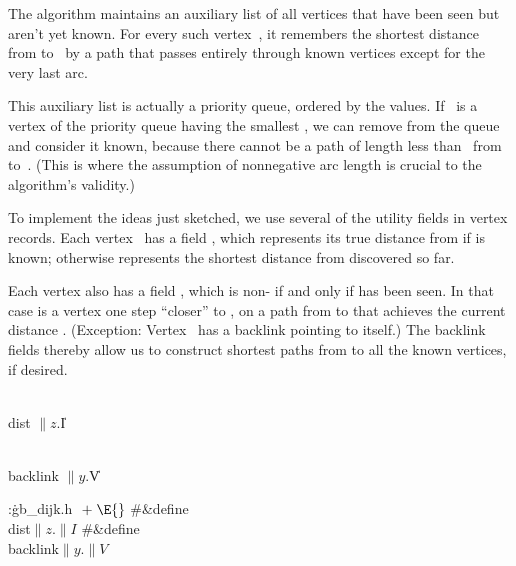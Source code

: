 The algorithm maintains an auxiliary list of all vertices that have been
seen but aren't yet known. For every such vertex~, it remembers
the shortest distance~ from  to~ by a path that
passes entirely
through known vertices except for the very last arc.

This auxiliary list is actually a priority queue, ordered by the 
values.
If ~is a vertex of the priority queue having the smallest , we
can
remove  from the queue and consider it known, because there cannot be
a path of length less than~ from  to~. (This is
where the
assumption of nonnegative arc length is crucial to the algorithm's validity.)

\fi

To implement the ideas just sketched, we use several of the utility
fields in vertex records. Each vertex~ has a  field ,
which represents its true distance from  if  is known;
otherwise
 represents the shortest distance from 
discovered so far.

Each vertex  also has a  field , which is non-\PB{$\NULL$}
if and only if  has been seen. In that case 
is a vertex one
step ``closer'' to , on a path from  to  that
achieves the
current distance . (Exception:
Vertex~ has a backlink pointing to itself.) The backlink
fields thereby allow us to construct shortest paths from  to all the
known vertices, if desired.

\Y\B\4\D\\{dist}\5
$\|z.{}$\|I\par
\B\4\D\\{backlink}\5
$\|y.{}$\|V%
\par
\Y\B\4:\.{gb\_dijk.h }\X${}\mathrel+\E{}$\6
\8\#\&{define} \\{dist}\5${}\|z.\|I{}$\6
\8\#\&{define} \\{backlink}\5${}\|y.\|V{}$\par
\fi

